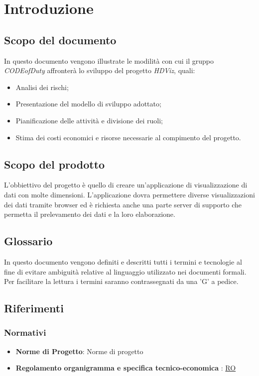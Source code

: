 \section{Introduzione}
\subsection{Scopo del documento}
	In questo documento vengono illustrate le modilità con cui il gruppo \emph{CODEofDuty} affronterà lo sviluppo del progetto \emph{HDViz}, quali:
	\begin{itemize}
    		\item Analisi dei rischi;
    		\item Presentazione del modello di sviluppo adottato;
    		\item Pianificazione delle attività e divisione dei ruoli;
    		\item Stima dei costi economici e risorse necessarie al compimento del progetto.
	\end{itemize}
\subsection{Scopo del prodotto}
	L'obbiettivo del progetto è quello di creare un'applicazione di visualizzazione di dati con molte dimensioni. L'applicazione dovra permettere diverse visualizzazioni dei dati tramite browser ed è richiesta anche una parte server di supporto che permetta il prelevamento dei dati e la loro elaborazione.
\subsection{Glossario}
	In questo documento vengono definiti e descritti tutti i termini e tecnologie al fine di evitare ambiguità relative al linguaggio utilizzato nei documenti formali. Per facilitare la lettura i termini saranno contrassegnati da una 'G' a pedice.  
\subsection{Riferimenti}
	\subsubsection{Normativi}
		\begin{itemize}
			\item \textbf{Norme di Progetto}: Norme di progetto
			\item \textbf{Regolamento organigramma e specifica tecnico-economica} : \href{https://www.math.unipd.it/~tullio/IS-1/2020/Progetto/RO.html}{RO}
		\end{itemize}
